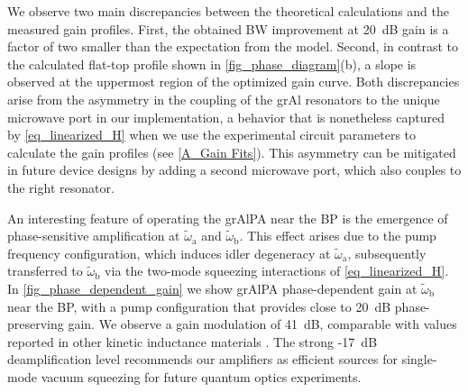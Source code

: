\documentclass[%
reprint,
floatfix,
superscriptaddress,
amsmath,amssymb,
aps,
pra,
]{revtex4-2}
\begin{document}
We observe two main discrepancies between the theoretical calculations and the measured gain profiles. First, the obtained BW improvement at 20~dB gain is a factor of two smaller than the expectation from the model. Second, in contrast to the calculated flat-top profile shown in \cref{fig_phase_diagram}(b), a slope is observed at the uppermost region of the optimized gain curve. Both discrepancies arise from the asymmetry in the coupling of the grAl resonators to the unique microwave port in our implementation, a behavior that is nonetheless captured by \cref{eq_linearized_H} when we use the experimental circuit parameters to calculate the gain profiles (see \cref{A_Gain Fits}). This asymmetry can be mitigated in future device designs by adding a second microwave port, which also couples to the right resonator. 

An interesting feature of operating the grAlPA near the BP is the emergence of phase-sensitive amplification at $\tilde{\omega}\mathrm{_a}$ and $\tilde{\omega}\mathrm{_b}$. This effect arises due to the pump frequency configuration, which induces idler degeneracy at $\tilde{\omega}\mathrm{_a}$, subsequently transferred to $\tilde{\omega}\mathrm{_b}$ via the two-mode squeezing interactions of \cref{eq_linearized_H}. 
In \cref{fig_phase_dependent_gain} we show grAlPA phase-dependent gain at $\tilde{\omega}\mathrm{_b}$ near the BP, with a pump configuration that provides close to 20~dB phase-preserving gain. We observe a gain modulation of 41~dB, comparable with values reported in other kinetic inductance materials \cite{Parker2022Mar,Xu2023Feb,Vaartjes2023Nov,Mohamed2023Nov,Frasca2023Dec}. The strong -17~dB deamplification level recommends our amplifiers as efficient sources for single-mode vacuum squeezing for future quantum optics experiments.
\end{document}
